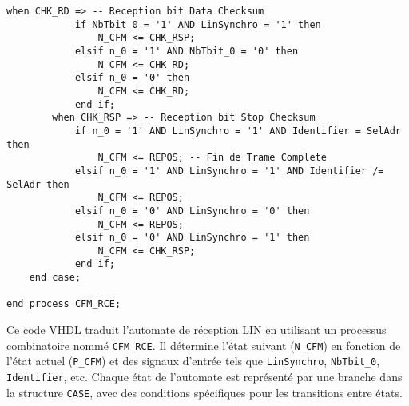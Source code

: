 \begin{lstlisting}[style=VHDLStyle, caption={Réseau Combinatoire d’Entrée Reception Trame}]
        when CHK_RD => -- Reception bit Data Checksum
            if NbTbit_0 = '1' AND LinSynchro = '1' then
                N_CFM <= CHK_RSP;
            elsif n_0 = '1' AND NbTbit_0 = '0' then
                N_CFM <= CHK_RD;
            elsif n_0 = '0' then
                N_CFM <= CHK_RD;
            end if;          
        when CHK_RSP => -- Reception bit Stop Checksum
            if n_0 = '1' AND LinSynchro = '1' AND Identifier = SelAdr then
                N_CFM <= REPOS; -- Fin de Trame Complete
            elsif n_0 = '1' AND LinSynchro = '1' AND Identifier /= SelAdr then
                N_CFM <= REPOS;
            elsif n_0 = '0' AND LinSynchro = '0' then
                N_CFM <= REPOS;
            elsif n_0 = '0' AND LinSynchro = '1' then
                N_CFM <= CHK_RSP;
            end if;               
    end case;
    
end process CFM_RCE;
\end{lstlisting}

Ce code VHDL traduit l’automate de réception LIN en utilisant un processus combinatoire nommé \texttt{CFM\_RCE}.
Il détermine l’état suivant (\texttt{N\_CFM}) en fonction de l’état actuel (\texttt{P\_CFM}) et des signaux d’entrée tels que \texttt{LinSynchro}, \texttt{NbTbit\_0}, \texttt{Identifier}, etc.
Chaque état de l’automate est représenté par une branche dans la structure \texttt{CASE}, avec des conditions spécifiques pour les transitions entre états.
\newline

